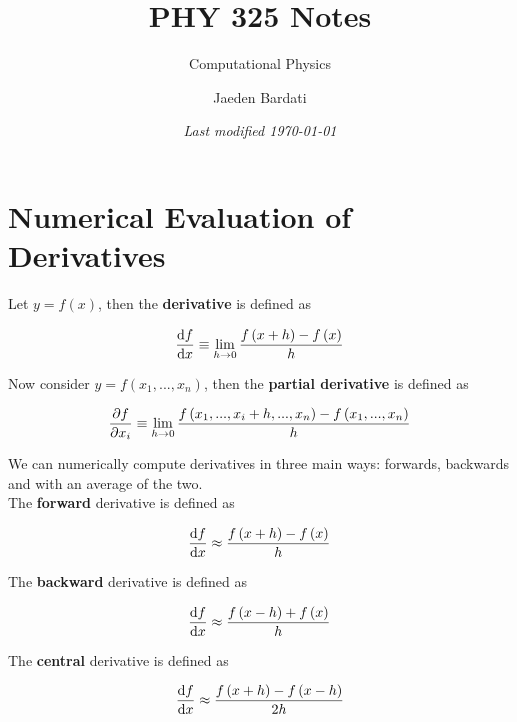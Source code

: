 \documentclass[]{article}
\title{PHY 325 Notes}
\subtitle{Computational Physics}
\author{Jaeden Bardati}
\date{\textit{Last modified \today}}
\begin{document}
\maketitle
\bigbreak

\section{Numerical Evaluation of Derivatives}\bigbreak\bigbreak


Let $y = f(x)$, then the \textbf{derivative} is defined as

\begin{equation}\label{eq:limit-definition-of-derivative}
	\dv{f}{x} \equiv \mathop {\lim }\limits_{h \to 0} \frac{{f\left( {x + h } \right) - f\left( x \right)}}{h }
\end{equation}\bigbreak

Now consider $y = f(x_1, ..., x_n)$, then the \textbf{partial derivative} is defined as

\begin{equation}\label{eq:limit-definition-of-partial-derivative}
	\pdv{f}{{x_i}} \equiv \mathop {\lim }\limits_{h \to 0} \frac{{f\left( {x_1, ..., x_{i}+h, ..., x_n} \right) - f\left(x_1, ..., x_n \right)}}{h }
\end{equation}\bigbreak

We can numerically compute derivatives in three main ways: forwards, backwards and with an average of the two.\\

The \textbf{forward} derivative is defined as

\begin{equation}\label{eq:forward-derivative}
	\dv{f}{x} \approx \frac{{f\left( {x + h } \right) - f\left( x \right)}}{h}
\end{equation}\bigbreak

The \textbf{backward} derivative is defined as

\begin{equation}\label{eq:backward-derivative}
	\dv{f}{x} \approx \frac{{f\left( {x - h } \right) + f\left( x \right)}}{h}
\end{equation}\bigbreak

The \textbf{central} derivative is defined as

\begin{equation}\label{eq:central-derivative}
	\dv{f}{x} \approx \frac{{f\left( {x + h } \right) - f\left( x - h \right)}}{2h}
\end{equation}\bigbreak
\end{document}
